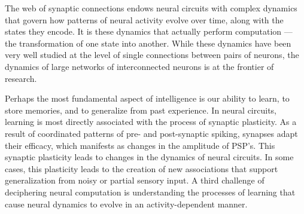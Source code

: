 
The web of synaptic connections endows neural circuits with complex
dynamics that govern how patterns of neural activity evolve over time,
along with the states they encode. It is these dynamics that actually
perform computation --- the transformation of one state into another.
While these dynamics have been very well studied at the level of
single connections between pairs of neurons, the dynamics of large
networks of interconnected neurons is at the frontier of research.

Perhaps the most fundamental aspect of intelligence is our ability to
learn, to store memories, and to generalize from past experience.  In
neural circuits, learning is most directly associated with the process
of synaptic plasticity. As a result of coordinated patterns of pre-
and post-synaptic spiking, synapses adapt their efficacy, which
manifests as changes in the amplitude of PSP's. This synaptic
  plasticity leads to changes in the dynamics of neural circuits.
In some cases, this plasticity leads to the creation of new associations
that support generalization from noisy or partial sensory input. 
A third challenge of deciphering neural computation is understanding
the processes of learning that cause neural dynamics to evolve in
an activity-dependent manner.

